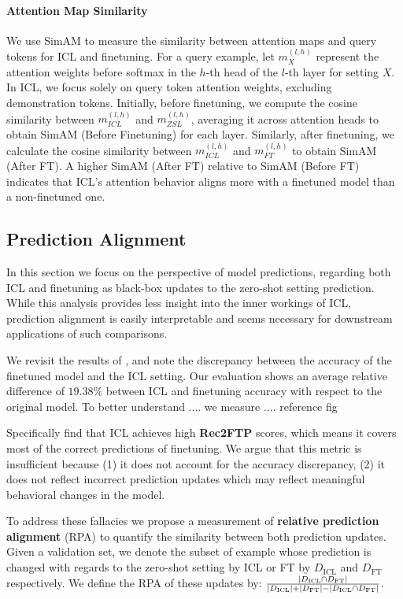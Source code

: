 \paragraph{Attention Map Similarity}
We use SimAM to measure the similarity between attention maps and query tokens for ICL and finetuning.
For a query example, let $m^{(l,h)}_X$ represent the attention weights before softmax in the $h$-th head of the $l$-th layer for setting $X$. In ICL, we focus solely on query token attention weights, excluding demonstration tokens. Initially, before finetuning, we compute the cosine similarity between $m^{(l,h)}_{ICL}$ and $m^{(l,h)}_{ZSL}$, averaging it across attention heads to obtain SimAM (Before Finetuning) for each layer.
Similarly, after finetuning, we calculate the cosine similarity between $m^{(l,h)}_{ICL}$ and $m^{(l,h)}_{FT}$ to obtain SimAM (After FT). A higher SimAM (After FT) relative to SimAM (Before FT) indicates that ICL's attention behavior aligns more with a finetuned model than a non-finetuned one.


\subsection{Prediction Alignment}
In this section we focus on the perspective of model predictions, regarding both ICL and finetuning as black-box updates to the zero-shot setting prediction.
While this analysis provides less insight into the inner workings of ICL, prediction alignment is easily interpretable and seems necessary for downstream applications of such comparisons.

We revisit the results of \cite{dai2023gpt}, and note the discrepancy between the accuracy of the finetuned model and the ICL setting.
Our evaluation shows an average relative difference of $19.38\%$ between ICL and finetuning accuracy with respect to the original model.
To better understand .... we measure .... reference fig

Specifically \cite{dai2023gpt} find that ICL achieves high \textbf{Rec2FTP} scores, which means it covers most of the correct predictions of finetuning.
We argue that this metric is insufficient because (1) it does not account for the accuracy discrepancy, (2) it does not reflect incorrect prediction updates which may reflect meaningful behavioral changes in the model.


To address these fallacies we propose a measurement of \textbf{relative prediction alignment} (RPA) to quantify the similarity between both prediction updates.
Given a validation set, we denote the subset of example whose prediction is changed with regards to the zero-shot setting by ICL or FT by $D_\text{ICL}$ and $D_\text{FT}$ respectively.
We define the RPA of these updates by: $\frac{\left|D_\text{ICL} \cap D_\text{FT}\right|}{\left|D_\text{ICL}\right| + \left|D_\text{FT}\right| - \left|D_\text{ICL} \cap D_\text{FT}\right|}$.     


